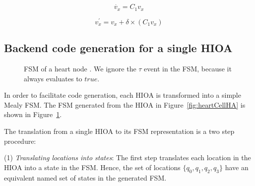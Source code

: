\begin{equation}
  \dot{v_x} = C_{1} v_x
  \label{eq:ode}
\end{equation}

\begin{equation}
  v^\prime_x = v_x + \delta \times (C_{1} v_x)
  \label{eq:euler_equiv}
\end{equation}

\setlength{\belowdisplayskip}{\baselineskip} 
\setlength{\belowdisplayshortskip}{\baselineskip}
\setlength{\abovedisplayskip}{\baselineskip} 
\setlength{\abovedisplayshortskip}{\baselineskip}


\subsection{Backend code generation for a single \ac{HIOA}}
\label{sec:backendCodeGeneration}

\begin{figure}
  \centering 
  \caption{\acf{FSM} of a heart node \label{fig:heartCellFSM}. We ignore
    the $\tau$ event in the \ac{FSM}, because it always evaluates to
    $true$.}
\end{figure}

In order to facilitate code generation, each \ac{HIOA} is transformed
into a simple Mealy \ac{FSM}. The \ac{FSM} generated from the \ac{HIOA}
in Figure~\ref{fig:heartCellHA} is shown in
Figure~\ref{fig:heartCellFSM}.

The translation from a single \ac{HIOA} to its \ac{FSM} representation
is a two step procedure:

(1) \textit{Translating locations into states}: The first step
  translates each location in the \ac{HIOA} into a state in the
  \ac{FSM}. Hence, the set of locations $\{q_{0}, q_{1}, q_{2}, q_{3}\}$
  have an equivalent named set of states in the generated \ac{FSM}.

